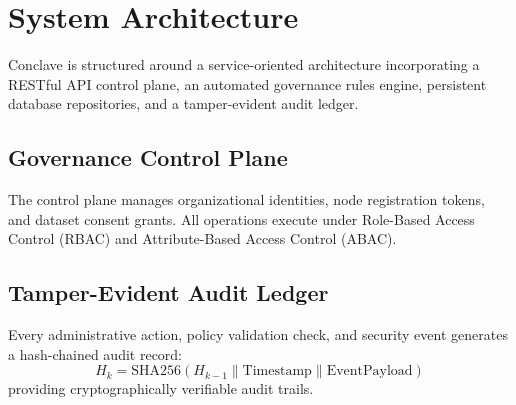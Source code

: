 \section{System Architecture}
\label{sec:system_architecture}

Conclave is structured around a service-oriented architecture incorporating a RESTful API control plane, an automated governance rules engine, persistent database repositories, and a tamper-evident audit ledger.

\subsection{Governance Control Plane}
The control plane manages organizational identities, node registration tokens, and dataset consent grants. All operations execute under Role-Based Access Control (RBAC) and Attribute-Based Access Control (ABAC).

\subsection{Tamper-Evident Audit Ledger}
Every administrative action, policy validation check, and security event generates a hash-chained audit record:
\begin{equation}
    H_k = \text{SHA256}(H_{k-1} \parallel \text{Timestamp} \parallel \text{EventPayload})
\end{equation}
providing cryptographically verifiable audit trails.
